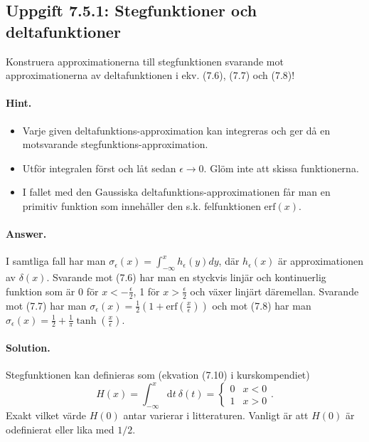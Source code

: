 \documentclass[%
oneside,                 %
final,                   %
10pt]{article}
\newenvironment{doconceexercise}{}{}
\newcounter{doconceexercisecounter}
\begin{document}
\begin{doconceexercise}

\subsection*{Uppgift 7.5.1: Stegfunktioner och deltafunktioner}

Konstruera approximationerna till stegfunktionen svarande mot approximationerna av deltafunktionen i ekv. (7.6), (7.7) och (7.8)!


\paragraph{Hint.}
\begin{itemize}
\item Varje given deltafunktions-approximation kan integreras och ger då en motsvarande stegfunktions-approximation. 

\item Utför integralen först och låt sedan $\epsilon \to 0$. Glöm inte att skissa funktionerna.

\item I fallet med den Gaussiska deltafunktions-approximationen får man en primitiv funktion som innehåller den s.k. felfunktionen $\mathrm{erf}(x)$.
\end{itemize}

\noindent


\paragraph{Answer.}
I samtliga fall har man $\sigma_\epsilon (x)=\int_{-\infty}^x h_\epsilon (y)dy$, där $h_\epsilon(x)$ är approximationen av $\delta(x)$. Svarande mot (7.6) har man en styckvis linjär och kontinuerlig funktion som är 0 för $x<-\frac{\epsilon}{2}$, 1 för $x>\frac{\epsilon}{2}$ och växer linjärt däremellan. Svarande mot (7.7) har man $\sigma_\epsilon(x)=\frac{1}{2}\left(1+\mathrm{erf}(\frac{x}{\epsilon})\right)$ och mot (7.8) har man $\sigma_\epsilon(x)=\frac{1}{2}+\frac{1}{\pi}\tanh(\frac{x}{\epsilon})$.



\paragraph{Solution.}
Stegfunktionen kan definieras som (ekvation (7.10) i kurskompendiet)
\begin{equation}
    H(x) =\int_{-\infty}^x\mathrm dt\ \delta(t)=\left\{\begin{array}{cc}
        0 & x < 0 \\
        1 & x > 0
    \end{array} \right..
    \label{step}
\end{equation}
Exakt vilket värde $H(0)$ antar varierar i litteraturen. Vanligt är att $H(0)$ är odefinierat eller lika med $1/2$. 


\end{doconceexercise}
\end{document}

